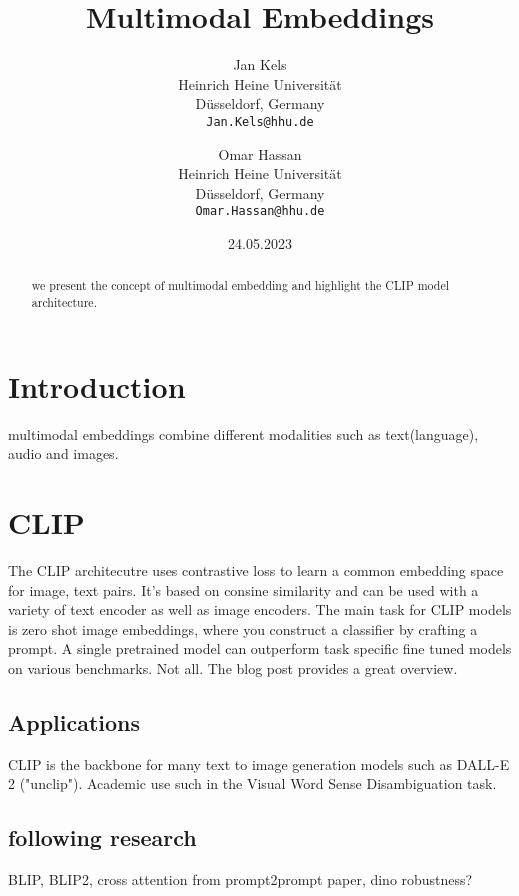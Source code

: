 \documentclass[11pt,a4paper]{article}
\title{Multimodal Embeddings}
\author{Jan Kels \\
  Heinrich Heine Universität \\
  Düsseldorf, Germany \\
  \texttt{Jan.Kels@hhu.de} \\\and
  Omar Hassan\\
  Heinrich Heine Universität \\
  Düsseldorf, Germany \\
  \texttt{Omar.Hassan@hhu.de}
  }
\date{24.05.2023}
\begin{document}
\maketitle
\begin{abstract} %
  we present the concept of multimodal embedding and highlight the CLIP model architecture.
\end{abstract}

\section{Introduction} %
multimodal embeddings combine different modalities such as text(language), audio and images.

\section{CLIP} %
The CLIP \cite{radford2021learning} architecutre uses contrastive loss to learn a common embedding space for image, text pairs.
It's based on consine similarity and can be used with a variety of text encoder as well as image encoders. 
The main task for CLIP models is zero shot image embeddings, where you construct a classifier by crafting a prompt.
A single pretrained model can outperform task specific fine tuned models on various benchmarks. Not all.
The blog post provides a great overview.

\subsection{Applications} %
CLIP is the backbone for many text to image generation models such as DALL-E 2 \cite{ramesh2022hierarchical} ("unclip").
Academic use such in the Visual Word Sense Disambiguation \cite{raganato-etal-2023-semeval} task.

\subsection{following research} %
BLIP, BLIP2, cross attention from prompt2prompt paper, dino robustness?




\appendix
\end{document}
